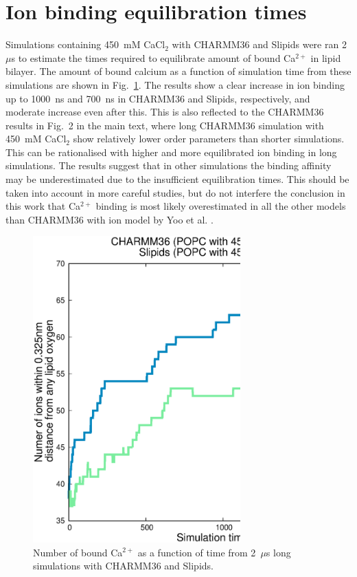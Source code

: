 \documentclass[twoside,twocolumn,9pt]{article}
\begin{document}



\section{Ion binding equilibration times}
Simulations containing 450~mM CaCl$_2$ with CHARMM36 and Slipids were ran 2~$\mu$s to estimate the times
required to equilibrate amount of bound Ca$^{2+}$ in lipid bilayer. The amount of bound calcium
as a function of simulation time from these simulations are shown in Fig.~\ref{longruns}.
The results show a clear increase in ion binding up to 1000~ns and 700~ns in CHARMM36 and Slipids, respectively,
and moderate increase even after this. This is also reflected to the CHARMM36 results in Fig.~2 in the main text, where
long CHARMM36 simulation with 450~mM CaCl$_2$ show relatively lower order parameters than shorter simulations. 
This can be rationalised with higher and more equilibrated ion binding in long simulations. 
The results suggest that in other simulations the binding affinity 
may be underestimated due to the insufficient equilibration times. This should be taken into account in more careful studies,
but do not interfere the conclusion in this work that Ca$^{2+}$ binding is most likely overestimated in all the
other models than CHARMM36 with ion model by Yoo et al. \cite{yoo16}.
\begin{figure}[h]
  \centering
  \includegraphics[width=8cm]{../Fig/bindingINlongRUNS.eps} 
  \caption{\label{longruns}
    Number of bound Ca$^{2+}$ as a function of time from 2~$\mu$s long simulations with CHARMM36 and Slipids.
}
\end{figure}
\end{document}

